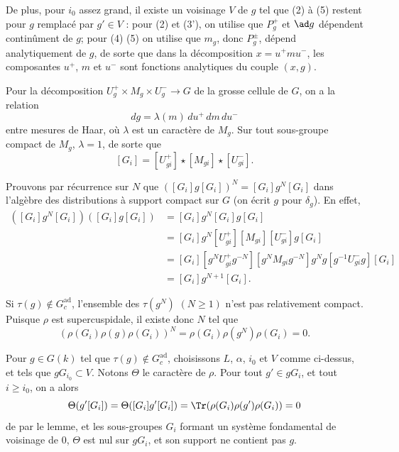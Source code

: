 De plus, pour \(i_0\) assez grand, il existe un voisinage \(V\) de \(g\) tel
que (2) à (5) restent pour \(g\) remplacé par \(g'\in V\) : pour (2) et
(3'), on utilise que \(P_g^{+}\) et \(\ad g\) dépendent continûment de \(g\);
pour (4) (5) on utilise que \(m_g\), donc \(P_g^{\pm}\), dépend
analytiquement de \(g\), de sorte que dans la décomposition
\(x=u^{+}mu^{-}\), les composantes \(u^{+}\), \(m\) et \(u^{-}\) sont
fonctions analytiques du couple \((x,g)\).


Pour la décomposition \(U_g^{+}\times M_g\times U_g^{-}\to G\) de la grosse
cellule de \(G\), on a la relation
\[
  dg=\lambda(m)\,du^{+}\,dm\,du^{-}
\]
entre mesures de Haar, où \(\lambda\) est un caractère de \(M_g\). Sur tout
sous-groupe compact de \(M_g\), \(\lambda=1\), de sorte que
\[
  [G_i]=[U_{gi}^{+}]\star[M_{gi}]\star[U_{gi}^{-}].
\]

Prouvons par récurrence sur \(N\) que
\( ([G_i]g[G_i])^{N}=[G_i]g^{N}[G_i] \) dans l'algèbre des distributions à
support compact sur \(G\) (on écrit \(g\) pour \(\delta_g\)). En effet,
\begin{align*}
([G_i]g^{N}[G_i])([G_i]g[G_i])
  &=[G_i]g^{N}[G_i]g[G_i]\\
  &=[G_i]g^{N}[U_{gi}^{+}][M_{gi}][U_{gi}^{-}]g[G_i]\\
  &=[G_i][g^{N}U_{gi}^{+}g^{-N}]
    [g^{N}M_{gi}g^{-N}]g^{N}g
    [g^{-1}U_{gi}^{-}g][G_i]\\
  &=[G_i]g^{N+1}[G_i].
\end{align*}

Si \(\tau(g)\notin G_c^{\mathrm{ad}}\), l'ensemble des \(\tau(g^{N})\)
\((N\geq1)\) n'est pas relativement compact. Puisque \(\rho\) est
supercuspidale, il existe donc \(N\) tel que
\[
  (\rho(G_i)\rho(g)\rho(G_i))^{N}
  =\rho(G_i)\rho(g^{N})\rho(G_i)=0.
\]

Pour \(g\in G(k)\) tel que \(\tau(g)\notin G_c^{\mathrm{ad}}\), choisissons
\(L\), \(\alpha\), \(i_0\) et \(V\) comme ci-dessus, et tels que
\(gG_{i_0}\subset V\). Notons \(\Theta\) le caractère de \(\rho\). Pour tout
\(g'\in gG_i\), et tout \(i\geq i_0\), on a alors
\[
  \Theta(g'[G_i])=\Theta([G_i]g'[G_i])
  =\Tr(\rho(G_i)\rho(g')\rho(G_i))=0
\]
de par le lemme, et les sous-groupes \(G_i\) formant un système fondamental de
voisinage de \(0\), \(\Theta\) est nul sur \(gG_i\), et son support ne contient
pas \(g\).


